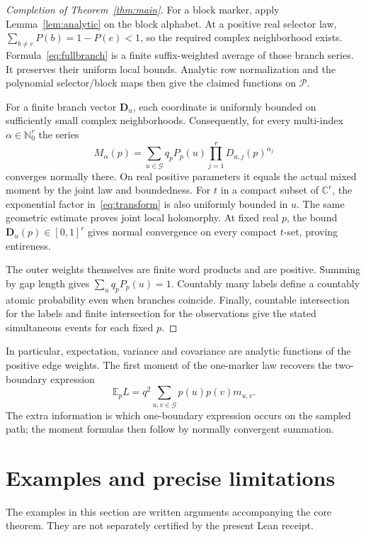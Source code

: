 \documentclass[11pt]{article}
\theoremstyle{definition}
\theoremstyle{remark}
\newcommand{\C}{\mathbb C}
\newcommand{\E}{\mathbb E}
\newcommand{\Gap}{\mathcal G}
\begin{document}
\begin{proof}[Completion of Theorem~\ref{thm:main}]
For a block marker, apply Lemma~\ref{lem:analytic} on the block alphabet. At a positive real selector law,
$\sum_{b\ne e}P(b)=1-P(e)<1$, so the required complex neighborhood exists. Formula~\eqref{eq:fullbranch} is a finite suffix-weighted average of those branch series. It preserves their uniform local bounds. Analytic row normalization and the polynomial selector/block maps then give the claimed functions on $\mathcal P$.

For a finite branch vector $\mathbf D_u$, each coordinate is uniformly bounded on sufficiently small complex neighborhoods. Consequently, for every multi-index $\alpha\in\mathbb N_0^r$ the series
\begin{equation}\label{eq:moments}
 M_\alpha(p)=\sum_{u\in\Gap}q_pP_p(u)
                 \prod_{j=1}^r D_{u,j}(p)^{\alpha_j}
\end{equation}
converges normally there. On real positive parameters it equals the actual mixed moment by the joint law and boundedness. For $t$ in a compact subset of $\C^r$, the exponential factor in~\eqref{eq:transform} is also uniformly bounded in $u$. The same geometric estimate proves joint local holomorphy. At fixed real $p$, the bound $\mathbf D_u(p)\in[0,1]^r$ gives normal convergence on every compact $t$-set, proving entireness.

The outer weights themselves are finite word products and are positive. Summing by gap length gives $\sum_uq_pP_p(u)=1$. Countably many labels define a countably atomic probability even when branches coincide. Finally, countable intersection for the labels and finite intersection for the observations give the stated simultaneous events for each fixed $p$.
\end{proof}

In particular, expectation, variance and covariance are analytic functions of the positive edge weights. The first moment of the one-marker law recovers the two-boundary expression
\[
 \E_pL=q^2\sum_{u,v\in\Gap}p(u)p(v)m_{u,v}.
\]
The extra information is which one-boundary expression occurs on the sampled path; the moment formulas then follow by normally convergent summation.

\section{Examples and precise limitations}\label{sec:examples}
The examples in this section are written arguments accompanying the core theorem. They are not separately certified by the present Lean receipt.
\end{document}
